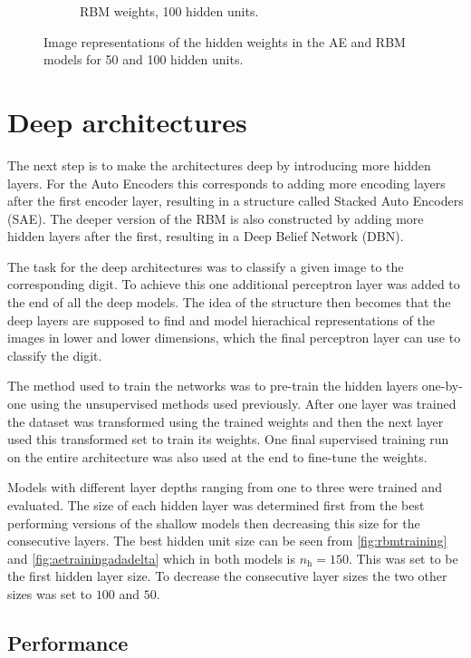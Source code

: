 \documentclass{article}
\begin{document}
\begin{figure}[!ht]
\begin{subfigure}[t]{0.47\textwidth}
    \caption{RBM weights, 100 hidden units.}
    \label{fig:w100rbm}
  \end{subfigure}
  \caption{
    Image representations of the hidden weights in the AE and RBM models
    for 50 and 100 hidden units.
  }
  \label{fig:hiddenweights}
\end{figure}

\section{Deep architectures}
The next step is to make the architectures deep by introducing more hidden layers.
For the Auto Encoders this corresponds to adding more encoding layers after the first encoder layer,
resulting in a structure called Stacked Auto Encoders (SAE).
The deeper version of the RBM is also constructed by adding more hidden layers after the first,
resulting in a Deep Belief Network (DBN).

The task for the deep architectures was to classify a given image to the corresponding digit.
To achieve this one additional perceptron layer was added to the end of all the deep models.
The idea of the structure then becomes that the deep layers are supposed to find and model
hierachical representations of the images in lower and lower dimensions,
which the final perceptron layer can use to classify the digit.

The method used to train the networks was to pre-train the hidden layers one-by-one
using the unsupervised methods used previously.
After one layer was trained the dataset was transformed using the trained weights
and then the next layer used this transformed set to train its weights.
One final supervised training run on the entire architecture
was also used at the end to fine-tune the weights.

Models with different layer depths ranging from one to three were trained and evaluated.
The size of each hidden layer was determined first from the best performing versions 
of the shallow models then decreasing this size for the consecutive layers.
The best hidden unit size can be seen from  \cref{fig:rbmtraining} and \cref{fig:aetrainingadadelta}
which in both models is $n_{\text{h}} = 150$.
This was set to be the first hidden layer size.
To decrease the consecutive layer sizes the two other sizes was set to $100$ and $50$.

\subsection{Performance}
\end{document}
